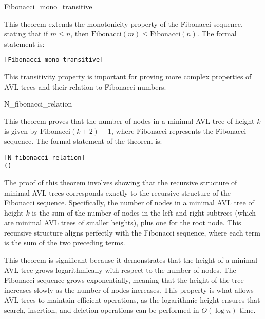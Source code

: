     \begin{thm}{Fibonacci\_mono\_transitive}

    This theorem extends the monotonicity property of the Fibonacci sequence, stating that if \( m \leq n \), then \( \text{Fibonacci}(m) \leq \text{Fibonacci}(n) \). The formal statement is:
    
    \begin{alltt}
    	[Fibonacci_mono_transitive]
    	\HOLTokenTurnstile{}  \HOLSymConst{\HOLTokenLeq{}}  \HOLSymConst{\HOLTokenImp{}}   \HOLSymConst{\HOLTokenLeq{}}  
    \end{alltt}
    
    \end{thm}
    This transitivity property is important for proving more complex properties of AVL trees and their relation to Fibonacci numbers.


    \begin{thm}{N\_fibonacci\_relation}

    This theorem proves that the number of nodes in a minimal AVL tree of height \( k \) is given by \( \text{Fibonacci}(k+2) - 1 \), where \( \text{Fibonacci} \) represents the Fibonacci sequence. The formal statement of the theorem is:

    \begin{alltt}
    	[N_fibonacci_relation]
    	\HOLTokenTurnstile{}   \HOLSymConst{=}  ( \HOLSymConst{\ensuremath{+}} ) \HOLSymConst{\ensuremath{-}} 
    \end{alltt}
    
    \end{thm}
    The proof of this theorem involves showing that the recursive structure of minimal AVL trees corresponds exactly to the recursive structure of the Fibonacci sequence. Specifically, the number of nodes in a minimal AVL tree of height \( k \) is the sum of the number of nodes in the left and right subtrees (which are minimal AVL trees of smaller heights), plus one for the root node. This recursive structure aligns perfectly with the Fibonacci sequence, where each term is the sum of the two preceding terms.

    This theorem is significant because it demonstrates that the height of a minimal AVL tree grows logarithmically with respect to the number of nodes. The Fibonacci sequence grows exponentially, meaning that the height of the tree increases slowly as the number of nodes increases. This property is what allows AVL trees to maintain efficient operations, as the logarithmic height ensures that search, insertion, and deletion operations can be performed in \( O(\log n) \) time.

